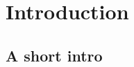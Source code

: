 








{\def\addcontentsline#1#2#3{}\maketitle}

\shortversion{\vspace{-20pt}}

\ifAbstract
	\begin{abstract}
		
	\end{abstract}
\fi

\ifTableOfContents 
	\tableofcontents
	\newpage
\fi

\section{Introduction}
	\subsection{A short intro}
	




\appendix


